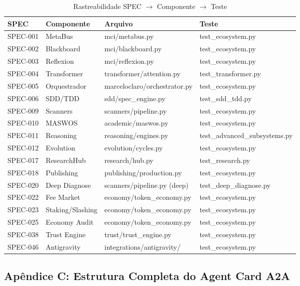 \begin{table}[H]
\centering
\caption{Rastreabilidade SPEC $\to$ Componente $\to$ Teste}
\label{tab:spec-traceability}
\begin{tabular}{@{}llll@{}}
\toprule
\textbf{SPEC} & \textbf{Componente} & \textbf{Arquivo} & \textbf{Teste} \\
\midrule
SPEC-001 & MetaBus & mci/metabus.py & test\_ecosystem.py \\
SPEC-002 & Blackboard & mci/blackboard.py & test\_ecosystem.py \\
SPEC-003 & Reflexion & mci/reflexion.py & test\_ecosystem.py \\
SPEC-004 & Transformer & transformer/attention.py & test\_transformer.py \\
SPEC-005 & Orquestrador & marceloclaro/orchestrator.py & test\_ecosystem.py \\
SPEC-006 & SDD/TDD & sdd/spec\_engine.py & test\_sdd\_tdd.py \\
SPEC-009 & Scanners & scanners/pipeline.py & test\_ecosystem.py \\
SPEC-010 & MASWOS & academic/maswos.py & test\_ecosystem.py \\
SPEC-011 & Reasoning & reasoning/engines.py & test\_advanced\_subsystems.py \\
SPEC-012 & Evolution & evolution/cycles.py & test\_ecosystem.py \\
SPEC-017 & ResearchHub & research/hub.py & test\_research.py \\
SPEC-018 & Publishing & publishing/production.py & test\_ecosystem.py \\
SPEC-020 & Deep Diagnose & scanners/pipeline.py (deep) & test\_deep\_diagnose.py \\
SPEC-022 & Fee Market & economy/token\_economy.py & test\_ecosystem.py \\
SPEC-023 & Staking/Slashing & economy/token\_economy.py & test\_ecosystem.py \\
SPEC-025 & Economy Audit & economy/token\_economy.py & test\_ecosystem.py \\
SPEC-038 & Trust Engine & trust/trust\_engine.py & test\_ecosystem.py \\
SPEC-046 & Antigravity & integrations/antigravity/ & test\_ecosystem.py \\
\bottomrule
\end{tabular}
\end{table}

\subsection{Apêndice C: Estrutura Completa do Agent Card A2A}
\label{sec:apendice-agentcard}


